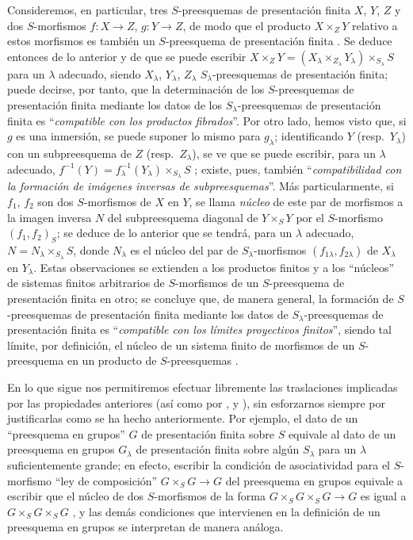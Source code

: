 \begin{env}[8.8.3]
Consideremos, en particular, tres $S$-preesquemas de presentación finita $X$, $Y$, $Z$ y dos $S$-morfismos $f:X\to Z$, $g:Y\to Z$, de modo que el producto $X\times_Z Y$ relativo a estos morfismos es también un $S$-preesquema de presentación finita .
Se deduce entonces de lo anterior y de  que se puede escribir $X\times_Z Y=(X_\lambda\times_{Z_\lambda}Y_\lambda)\times_{S_\lambda}S$ para un $\lambda$ adecuado, siendo $X_\lambda$, $Y_\lambda$, $Z_\lambda$ $S_\lambda$-preesquemas de presentación finita; puede decirse, por tanto, que la determinación de los $S$-preesquemas de presentación finita mediante los datos de los $S_\lambda$-preesquemas de presentación finita es ``\emph{compatible con los productos fibrados}''.
Por otro lado, hemos visto  que, si $g$ es una inmersión, se puede suponer lo mismo para $g_\lambda$; identificando $Y$ (resp.\ $Y_\lambda$) con un subpreesquema de $Z$ (resp.\ $Z_\lambda$), se ve que se puede escribir, para un $\lambda$ adecuado, $f^{-1}(Y)=f_\lambda^{-1}(Y_\lambda)\times_{S_\lambda}S$ ;
existe, pues, también ``\emph{compatibilidad con la formación de imágenes inversas de subpreesquemas}''.
Más particularmente, si $f_1$, $f_2$ son dos $S$-morfismos de $X$ en $Y$, se llama \emph{núcleo} de este par de morfismos a la imagen inversa $N$ del subpreesquema diagonal de $Y\times_S Y$ por el $S$-morfismo $(f_1,f_2)_S$; se deduce de lo anterior que se tendrá, para un $\lambda$ adecuado, $N=N_\lambda\times_{S_\lambda}S$, donde $N_\lambda$ es el núcleo del par de $S_\lambda$-morfismos $(f_{1\lambda},f_{2\lambda})$ de $X_\lambda$ en $Y_\lambda$.
Estas observaciones se extienden a los productos finitos y a los ``núcleos'' de sistemas finitos arbitrarios de $S$-morfismos de un $S$-preesquema de presentación finita en
otro; se concluye que, de manera general, la formación de $S$-preesquemas de presentación finita mediante los datos de $S_\lambda$-preesquemas de presentación finita es ``\emph{compatible con los límites proyectivos finitos}'', siendo tal límite, por definición, el núcleo de un sistema finito de morfismos de un $S$-preesquema en un producto de $S$-preesquemas .

En lo que sigue nos permitiremos efectuar libremente las traslaciones implicadas por las propiedades anteriores (así como por ,  y ), sin esforzarnos siempre por justificarlas como se ha hecho anteriormente.
Por ejemplo, el dato de un ``preesquema en grupos'' $G$ de presentación finita sobre $S$ equivale al dato de un preesquema en grupos $G_\lambda$ de presentación finita sobre algún $S_\lambda$ para un $\lambda$ suficientemente grande; en efecto, escribir la condición de asociatividad para el $S$-morfismo ``ley de composición'' $G\times_S G\to G$ del preesquema en grupos equivale a escribir que el núcleo de dos $S$-morfismos de la forma $G\times_S G\times_S G\to G$ es igual a $G\times_S G\times_S G$ , y las demás condiciones que intervienen en la definición de un preesquema en grupos se interpretan de manera análoga.
\end{env}

